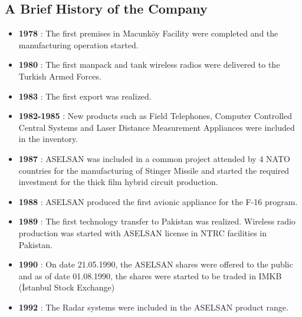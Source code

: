 \subsection{A Brief History of the Company}
\begin{itemize}
\item \textbf{ 1978 } : The first premises in Macunköy Facility were completed and the manufacturing operation started.
\item \textbf{ 1980 } : The first manpack and tank wireless radios were delivered to the Turkish Armed Forces.
\item \textbf{ 1983 } : The first export was realized. 
\item \textbf{ 1982-1985 } : New products such as Field Telephones, Computer Controlled Central Systems and Laser Distance Measurement Appliances were included in the inventory. 
\item \textbf{  1987 } : ASELSAN was included in a common project attended by 4 NATO countries for the manufacturing of Stinger Missile and started the required investment for the thick film hybrid circuit production. 
\item \textbf{  1988 } : ASELSAN produced the first avionic appliance for the F-16 program.
\item \textbf{ 1989 } : The first technology transfer to Pakistan was realized. Wireless radio production was started with ASELSAN license in NTRC facilities in Pakistan. 
\item \textbf{  1990 } : On date 21.05.1990, the ASELSAN shares were offered to the public and as of date 01.08.1990, the shares were started to be traded in IMKB (İstanbul Stock Exchange)
\item \textbf{ 1992 } : The Radar systems were included in the ASELSAN product range.

\end{itemize}
